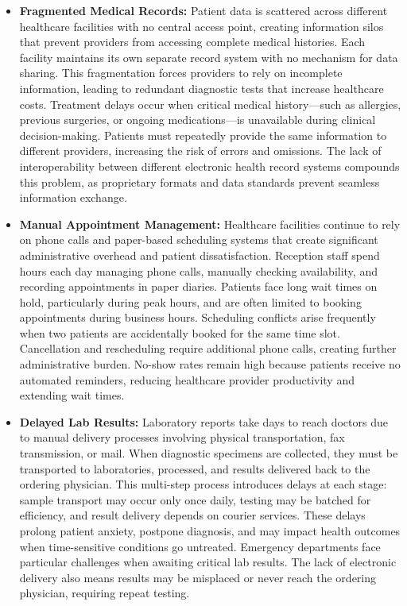 \begin{itemize}
    \item \textbf{Fragmented Medical Records:} Patient data is scattered across different healthcare facilities with no central access point, creating information silos that prevent providers from accessing complete medical histories. Each facility maintains its own separate record system with no mechanism for data sharing. This fragmentation forces providers to rely on incomplete information, leading to redundant diagnostic tests that increase healthcare costs. Treatment delays occur when critical medical history—such as allergies, previous surgeries, or ongoing medications—is unavailable during clinical decision-making. Patients must repeatedly provide the same information to different providers, increasing the risk of errors and omissions. The lack of interoperability between different electronic health record systems compounds this problem, as proprietary formats and data standards prevent seamless information exchange.

    \item \textbf{Manual Appointment Management:} Healthcare facilities continue to rely on phone calls and paper-based scheduling systems that create significant administrative overhead and patient dissatisfaction. Reception staff spend hours each day managing phone calls, manually checking availability, and recording appointments in paper diaries. Patients face long wait times on hold, particularly during peak hours, and are often limited to booking appointments during business hours. Scheduling conflicts arise frequently when two patients are accidentally booked for the same time slot. Cancellation and rescheduling require additional phone calls, creating further administrative burden. No-show rates remain high because patients receive no automated reminders, reducing healthcare provider productivity and extending wait times.

    \item \textbf{Delayed Lab Results:} Laboratory reports take days to reach doctors due to manual delivery processes involving physical transportation, fax transmission, or mail. When diagnostic specimens are collected, they must be transported to laboratories, processed, and results delivered back to the ordering physician. This multi-step process introduces delays at each stage: sample transport may occur only once daily, testing may be batched for efficiency, and result delivery depends on courier services. These delays prolong patient anxiety, postpone diagnosis, and may impact health outcomes when time-sensitive conditions go untreated. Emergency departments face particular challenges when awaiting critical lab results. The lack of electronic delivery also means results may be misplaced or never reach the ordering physician, requiring repeat testing.


\end{itemize}
